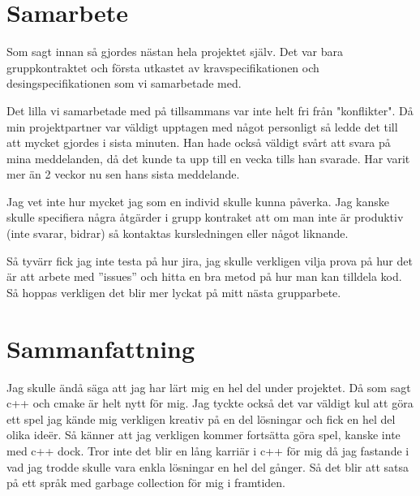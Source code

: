 \documentclass{TDP003mall}
\begin{document}
\section{Samarbete}
Som sagt innan så gjordes nästan hela projektet själv. Det var bara 
gruppkontraktet och första utkastet av kravspecifikationen och desingspecifikationen som 
vi samarbetade med. 

Det lilla vi samarbetade med på tillsammans var inte helt fri från "konflikter".
Då min projektpartner var väldigt upptagen med något personligt så ledde det till att 
mycket gjordes i sista minuten. Han hade också väldigt svårt att svara på mina meddelanden,
då det kunde ta upp till en vecka tills han svarade. Har varit mer än 2 veckor nu sen hans sista 
meddelande. 

Jag vet inte hur mycket jag som en individ skulle kunna påverka. 
Jag kanske skulle specifiera några åtgärder i grupp kontraket att om man inte 
är produktiv (inte svarar, bidrar) så kontaktas kursledningen eller något liknande.

Så tyvärr fick jag inte testa på hur jira, jag skulle verkligen vilja prova på hur det är 
att arbete med ''issues'' och hitta en bra metod på hur man kan tilldela kod.
Så hoppas verkligen det blir mer lyckat på mitt nästa grupparbete.
\section{Sammanfattning}
Jag skulle ändå säga att jag har lärt mig en hel del under projektet.
Då som sagt c++ och cmake är helt nytt för mig. 
Jag tyckte också det var väldigt kul att göra ett spel jag kände mig verkligen kreativ på 
en del lösningar och fick en hel del olika ideër. Så känner att jag verkligen kommer fortsätta göra spel,
kanske inte med c++ dock.
Tror inte det blir en lång karriär i c++ för mig då jag fastande i vad jag trodde skulle vara enkla lösningar 
en hel del gånger. Så det blir att satsa på ett språk med garbage collection för mig i framtiden.
\end{document}
